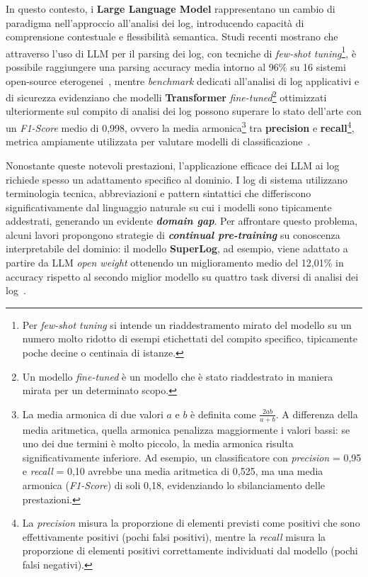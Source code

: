 \documentclass[12pt,twoside]{report}
\begin{document}
In questo contesto, i \textbf{Large Language Model} rappresentano un cambio di paradigma nell'approccio all'analisi dei log, introducendo capacità di comprensione contestuale e flessibilità semantica. Studi recenti mostrano che attraverso l'uso di LLM per il parsing dei log, con tecniche di \textit{few-shot tuning}\footnote{Per \textit{few-shot tuning} si intende un riaddestramento mirato del modello su un numero molto ridotto di esempi etichettati del compito specifico, tipicamente poche decine o centinaia di istanze.}, è possibile raggiungere una parsing accuracy media intorno al 96\% su 16 sistemi open-source eterogenei~\cite{ma2024llmparser}, mentre \textit{benchmark} dedicati all'analisi di log applicativi e di sicurezza evidenziano che modelli \textbf{Transformer} \textit{fine-tuned}\footnote{Un modello \textit{fine-tuned} è un modello che è stato riaddestrato in maniera mirata per un determinato scopo.} ottimizzati ulteriormente sul compito di analisi dei log possono superare lo stato dell'arte con un \textit{F1-Score} medio di 0{,}998, ovvero la media armonica\footnote{La media armonica di due valori $a$ e $b$ è definita come $\frac{2ab}{a+b}$. A differenza della media aritmetica, quella armonica penalizza maggiormente i valori bassi: se uno dei due termini è molto piccolo, la media armonica risulta significativamente inferiore. Ad esempio, un classificatore con \textit{precision} = 0{,}95 e \textit{recall} = 0{,}10 avrebbe una media aritmetica di 0{,}525, ma una media armonica (\textit{F1-Score}) di soli 0{,}18, evidenziando lo sbilanciamento delle prestazioni.} tra \textbf{precision} e \textbf{recall}\footnote{La \textit{precision} misura la proporzione di elementi previsti come positivi che sono effettivamente positivi (pochi falsi positivi), mentre la \textit{recall} misura la proporzione di elementi positivi correttamente individuati dal modello (pochi falsi negativi).}, metrica ampiamente utilizzata per valutare modelli di classificazione~\cite{karlsen2023benchmarking_llm_log}.

Nonostante queste notevoli prestazioni, l'applicazione efficace dei LLM ai log richiede spesso un adattamento specifico al dominio. I log di sistema utilizzano terminologia tecnica, abbreviazioni e pattern sintattici che differiscono significativamente dal linguaggio naturale su cui i modelli sono tipicamente addestrati, generando un evidente \textbf{\textit{domain gap}}. Per affrontare questo problema, alcuni lavori propongono strategie di \textbf{\textit{continual pre-training}} su conoscenza interpretabile del dominio: il modello \textbf{SuperLog}, ad esempio, viene adattato a partire da LLM \textit{open weight} ottenendo un miglioramento medio del 12{,}01\% in accuracy rispetto al secondo miglior modello su quattro task diversi di analisi dei log~\cite{ji2024adapting_llm_log}.
\end{document}
